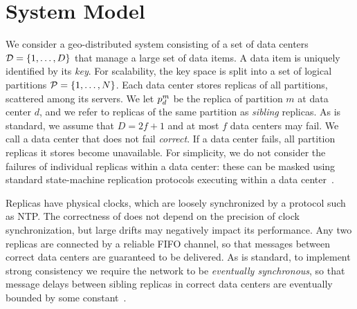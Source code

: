 \section{System Model}
\label{sec:sysmodel}

We consider a geo-distributed system consisting of a set of data centers
$\mathcal{D}=\{1, \dots, D\}$ that manage a large set of data items. A data item is
uniquely identified by its \emph{key}. For scalability, the key space is split
into a set of logical partitions $\mathcal{P} = \{1, \ldots, N\}$.  Each data
center stores replicas of all partitions, scattered among its servers.
We let $\partition^m_d$ be the replica of partition $m$ at data center $d$, and
we refer to replicas of the same partition as \emph{sibling} replicas.
As is standard, we assume that $D = 2f+1$ and at most $f$ data centers may fail.
We call a data center that does not fail {\em correct}. If a data center fails,
all partition replicas it stores become unavailable. For simplicity, we do not
consider the failures of individual replicas within a data center: these can be
masked using standard state-machine replication protocols executing within a
data center~\cite{smr,paxos}.

Replicas have physical clocks, which are loosely synchronized by a
protocol such as NTP. The correctness of \System does not depend on the
precision of clock synchronization, but large %
drifts may negatively impact its performance.
Any two replicas are connected by a reliable FIFO channel, so that 
messages between correct data centers are guaranteed to be %
delivered.
As is standard, to implement strong consistency we require the network to be
{\em eventually synchronous}, so that message delays between sibling replicas in correct
data centers are eventually bounded by some constant~\cite{psync}.



